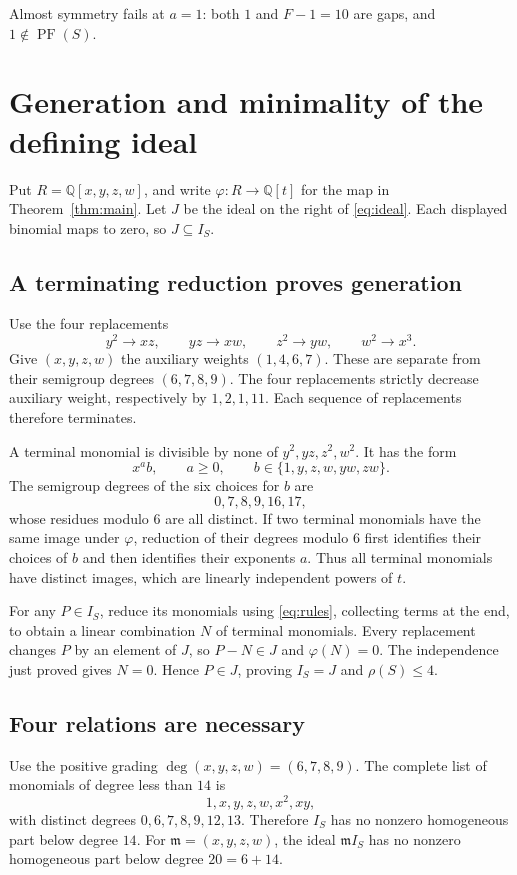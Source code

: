 \documentclass[11pt,a4paper]{article}
\newcommand{\QQ}{\mathbb Q}
\newcommand{\PF}{\operatorname{PF}}
\newcommand{\frakm}{\mathfrak m}
\begin{document}
Almost symmetry fails at $a=1$: both $1$ and $F-1=10$ are gaps, and
$1\notin\PF(S)$.

\section{Generation and minimality of the defining ideal}
Put $R=\QQ[x,y,z,w]$, and write $\varphi:R\to\QQ[t]$ for the map in
Theorem~\ref{thm:main}. Let $J$ be the ideal on the right of \eqref{eq:ideal}.
Each displayed binomial maps to zero, so $J\subseteq I_S$.

\subsection{A terminating reduction proves generation}
Use the four replacements
\begin{equation}\label{eq:rules}
 y^2\longrightarrow xz,\qquad yz\longrightarrow xw,\qquad
 z^2\longrightarrow yw,\qquad w^2\longrightarrow x^3.
\end{equation}
Give $(x,y,z,w)$ the auxiliary weights $(1,4,6,7)$. These are separate from
their semigroup degrees $(6,7,8,9)$. The four replacements strictly decrease
auxiliary weight, respectively by $1,2,1,11$. Each sequence of replacements
therefore terminates.

A terminal monomial is divisible by none of $y^2,yz,z^2,w^2$. It has the form
\begin{equation}\label{eq:basis}
 x^a b,\qquad a\geq0,\qquad b\in\{1,y,z,w,yw,zw\}.
\end{equation}
The semigroup degrees of the six choices for $b$ are
\[
 0,7,8,9,16,17,
\]
whose residues modulo $6$ are all distinct. If two terminal monomials have
the same image under $\varphi$, reduction of their degrees modulo $6$ first
identifies their choices of $b$ and then identifies their exponents $a$.
Thus all terminal monomials have distinct images, which are linearly
independent powers of $t$.

For any $P\in I_S$, reduce its monomials using \eqref{eq:rules}, collecting
terms at the end, to obtain a linear combination $N$ of terminal monomials.
Every replacement changes $P$ by an element of $J$, so $P-N\in J$ and
$\varphi(N)=0$. The independence just proved gives $N=0$. Hence $P\in J$,
proving $I_S=J$ and $\rho(S)\leq4$.

\subsection{Four relations are necessary}
Use the positive grading $\deg(x,y,z,w)=(6,7,8,9)$. The complete list of
monomials of degree less than $14$ is
\[
 1,x,y,z,w,x^2,xy,
\]
with distinct degrees $0,6,7,8,9,12,13$. Therefore $I_S$ has no nonzero
homogeneous part below degree $14$. For $\frakm=(x,y,z,w)$, the ideal
$\frakm I_S$ has no nonzero homogeneous part below degree $20=6+14$.
\end{document}

